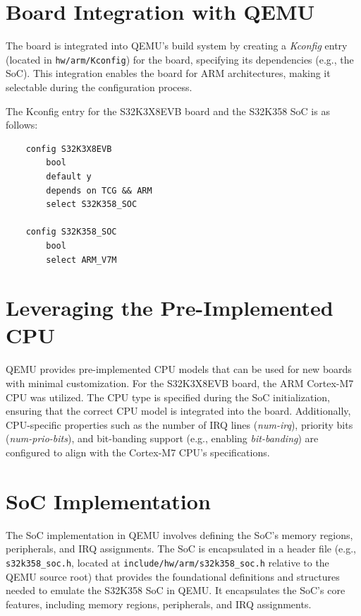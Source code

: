 \section{Board Integration with QEMU}
The board is integrated into QEMU’s build system by creating a \textit{Kconfig} entry (located in \texttt{hw/arm/Kconfig}) for the board, specifying its dependencies (e.g., the SoC). This integration enables the board for ARM architectures, making it selectable during the configuration process.

\vspace{0.3cm}

\noindent The Kconfig entry for the S32K3X8EVB board and the S32K358 SoC is as follows:
\begin{verbatim}
    config S32K3X8EVB
        bool
        default y
        depends on TCG && ARM
        select S32K358_SOC
        
    config S32K358_SOC
        bool
        select ARM_V7M
\end{verbatim}

\section{Leveraging the Pre-Implemented CPU}
QEMU provides pre-implemented CPU models that can be used for new boards with minimal customization. For the S32K3X8EVB board, the ARM Cortex-M7 CPU was utilized. The CPU type is specified during the SoC initialization, ensuring that the correct CPU model is integrated into the board. Additionally, CPU-specific properties such as the number of IRQ lines (\textit{num-irq}), priority bits (\textit{num-prio-bits}), and bit-banding support (e.g., enabling \textit{bit-banding}) are configured to align with the Cortex-M7 CPU’s specifications.

\section{SoC Implementation}
The SoC implementation in QEMU involves defining the SoC’s memory regions, peripherals, and IRQ assignments. The SoC is encapsulated in a header file (e.g., \texttt{s32k358\_soc.h}, located at \texttt{include/hw/arm/s32k358\_soc.h} relative to the QEMU source root) that provides the foundational definitions and structures needed to emulate the S32K358 SoC in QEMU. It encapsulates the SoC's core features, including memory regions, peripherals, and IRQ assignments. 

